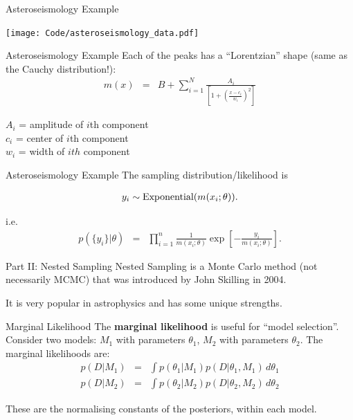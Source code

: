\begin{frame}[t]{Asteroseismology Example}


\begin{center}
\texttt{[image: Code/asteroseismology\_data.pdf]}
\end{center}

\end{frame}


\begin{frame}[t]{Asteroseismology Example}
Each of the peaks has a ``Lorentzian'' shape
(same as the Cauchy distribution!):
\begin{eqnarray}
m(x) &=& B + \sum_{i=1}^N \frac{A_i}
{\left[1 + \left(\frac{x - c_i}{w_i}\right)^2\right]} 
\end{eqnarray}

$A_i$ = amplitude of $i$th component\\
$c_i$ = center of $i$th component\\
$w_i$ = width of $ith$ component\\


\end{frame}

\begin{frame}[t]{Asteroseismology Example}
The sampling distribution/likelihood is

\begin{eqnarray*}
y_i \sim \textnormal{Exponential}(m(x_i; \theta)).
\end{eqnarray*}

i.e.
\begin{eqnarray*}
p(\{y_i\} | \theta) &=& \prod_{i=1}^n \frac{1}{m(x_i; \theta)}
\exp\left[-\frac{y_i}{m(x_i; \theta)}\right].
\end{eqnarray*}
\end{frame}



\begin{frame}[t]{Part II: Nested Sampling}
Nested Sampling is a Monte Carlo method (not necessarily MCMC) that was
introduced by John Skilling in 2004.

It is very popular in astrophysics and has some unique strengths.
\end{frame}


\begin{frame}[t]{Marginal Likelihood}
The {\bf marginal likelihood} is useful for ``model selection''. Consider
two models: $M_1$ with parameters $\theta_1$, $M_2$ with parameters $\theta_2$.
The marginal likelihoods are:
\begin{eqnarray*}
p(D | M_1) &=& \int p(\theta_1 | M_1) p(D | \theta_1, M_1) \, d\theta_1\\
p(D | M_2) &=& \int p(\theta_2 | M_2) p(D | \theta_2, M_2) \, d\theta_2
\end{eqnarray*}

These are the normalising constants of the posteriors, within each model.
\end{frame}



